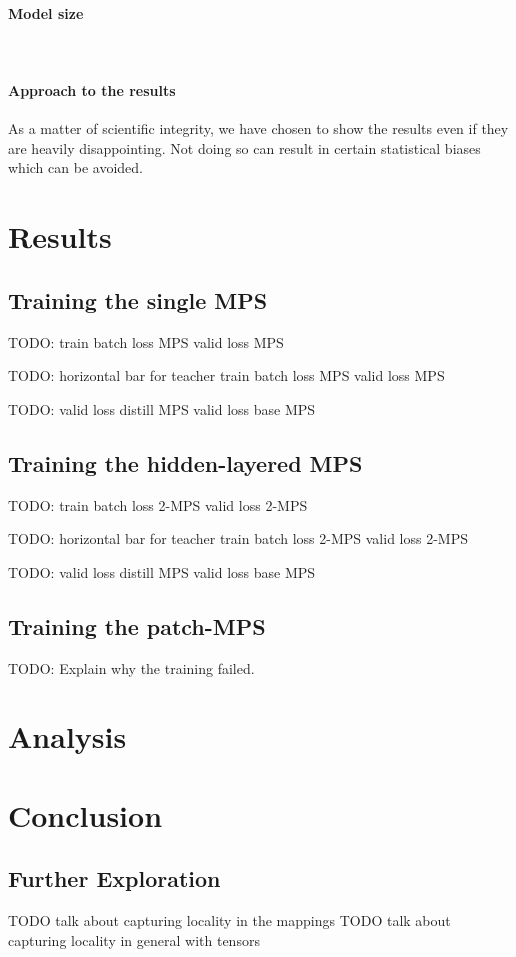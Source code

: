 \documentclass[11pt]{article}
\theoremstyle{definition}
\theoremstyle{definition}
\begin{document}
\paragraph{Model size} ${}$ \\

\paragraph{Approach to the results}
As a matter of scientific integrity, we have chosen to show the 
results even if they are heavily disappointing. Not doing so 
can result in certain statistical biases which can be avoided.



\section{Results}
\subsection{Training the single MPS}
TODO:
train batch loss MPS
valid loss MPS

TODO: 
horizontal bar for teacher
train batch loss MPS
valid loss MPS

TODO: 
valid loss distill MPS
valid loss base MPS

\subsection{Training the hidden-layered MPS}
TODO: 
train batch loss 2-MPS
valid loss 2-MPS

TODO: 
horizontal bar for teacher
train batch loss 2-MPS
valid loss 2-MPS

TODO: 
valid loss distill MPS
valid loss base MPS

\subsection{Training the patch-MPS}
TODO: Explain why the training failed.


\section{Analysis}




\section{Conclusion}



\subsection{Further Exploration}
TODO talk about capturing locality in the mappings
TODO talk about capturing locality in general with tensors

\printbibliography
\end{document}
